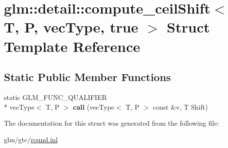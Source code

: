 \hypertarget{structglm_1_1detail_1_1compute__ceilShift_3_01T_00_01P_00_01vecType_00_01true_01_4}{\section{glm\-:\-:detail\-:\-:compute\-\_\-ceil\-Shift$<$ T, P, vec\-Type, true $>$ Struct Template Reference}
\label{structglm_1_1detail_1_1compute__ceilShift_3_01T_00_01P_00_01vecType_00_01true_01_4}
}
\subsection*{Static Public Member Functions}
\begin{DoxyCompactItemize}
\item 
\hypertarget{structglm_1_1detail_1_1compute__ceilShift_3_01T_00_01P_00_01vecType_00_01true_01_4_ae120f08254abe3447d5f3310138fc6a3}{static G\-L\-M\-\_\-\-F\-U\-N\-C\-\_\-\-Q\-U\-A\-L\-I\-F\-I\-E\-R \\*
vec\-Type$<$ T, P $>$ {\bfseries call} (vec\-Type$<$ T, P $>$ const \&v, T Shift)}\label{structglm_1_1detail_1_1compute__ceilShift_3_01T_00_01P_00_01vecType_00_01true_01_4_ae120f08254abe3447d5f3310138fc6a3}

\end{DoxyCompactItemize}


The documentation for this struct was generated from the following file\-:\begin{DoxyCompactItemize}
\item 
glm/gtc/\hyperlink{round_8inl}{round.\-inl}\end{DoxyCompactItemize}
